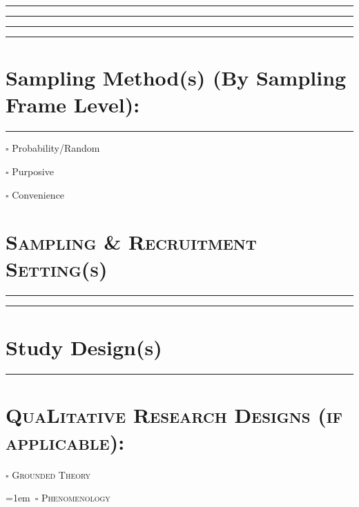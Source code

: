 \documentclass[11pt,]{tufte-book}
\newcommand{\Frule}{
    \vspace*{-1em}
    \begin{fullwidth}\textcolor{blublk}{\rule{\linewidth}{0.2mm}}\end{fullwidth}
}
\newcommand{\SFrule}[1][0.1mm]{
    \begin{fullwidth}\textcolor{blublk}{\rule{\linewidth}{#1}}\end{fullwidth}
}
\begin{document}

\medskip

\SFrule

\medskip

\SFrule


\medskip

\SFrule

\medskip

\SFrule

\section{Sampling Method(s) (By Sampling Frame
Level):}\label{sampling-methods-by-sampling-frame-level}

\Frule

\tufteskip

\hspace*{2em} \(\square\) Probability/Random

\hspace*{2em} \(\square\) Purposive

\hspace*{2em} \(\square\) Convenience

\section{\texorpdfstring{\textsc{Sampling \& Recruitment Setting(s)}}{}}\label{section-1}

\medskip

\SFrule

\medskip

\SFrule

\section{Study Design(s)}\label{study-designs}

\Frule

\section{\texorpdfstring{\textsc{Qua\LARGE{L}itative Research Designs (if applicable):}}{}}\label{section-2}

\hspace*{2em} \(\square\) \textsc{Grounded Theory}

\parindent=1em~\(\square\) \textsc{Phenomenology}
\end{document}
